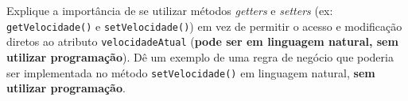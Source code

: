 \documentclass[12pt,a4paper]{article}
\newcommand{\resposta}[1]{
\noindent
\framebox[\textwidth]{
\begin{minipage}{0.98\textwidth}
\vspace{#1}
\end{minipage}
}
}
\begin{document}
\begin{enumerate}
\begin{center}
    \end{center}

    Explique a importância de se utilizar métodos \textit{getters} e \textit{setters} (ex: \texttt{getVelocidade()} e \texttt{setVelocidade()}) em vez de permitir o acesso e modificação diretos ao atributo \texttt{velocidadeAtual} (\textbf{pode ser em linguagem natural, sem utilizar programação}).
     Dê um exemplo de uma regra de negócio que poderia ser implementada no método \texttt{setVelocidade()} em linguagem natural, \textbf{sem utilizar programação}.

    \resposta{12cm}

\end{enumerate}
\vspace{0.8cm}
\end{document}
